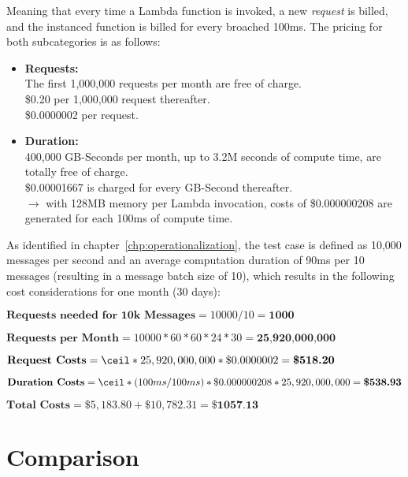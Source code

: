 Meaning that every time a Lambda function is invoked, a new \textit{request} is billed, and the instanced function is billed for every broached 100ms. The pricing for both subcategories is as follows: 

\begin{itemize}[label={}]
    \item \textbf{Requests:}\\
        The first 1,000,000 requests per month are free of charge.\\
        \$0.20 per 1,000,000 request thereafter.\\
        \$0.0000002 per request.\\
    \item \textbf{Duration:}\\
        400,000 GB-Seconds per month, up to 3.2M seconds of compute time, are totally free of charge.\\
        \$0.00001667 is charged for every GB-Second thereafter.\\
        $\longrightarrow$ with 128MB memory per Lambda invocation, costs of \$0.000000208 are generated for each 100ms of compute time. 
\end{itemize}

As identified in chapter~\vref{chp:operationalization}, the test case is defined as 10,000 messages per second and an average computation duration of 90ms per 10 messages (resulting in a message batch size of 10), which results in the following cost considerations for one month (30 days): 

$\textbf{Requests needed for 10k Messages} = 10000 / 10 = \textbf{1000}$

$\textbf{Requests per Month} = 10000 * 60 * 60 * 24 * 30 = \textbf{25,920,000,000}$

$\textbf{Request Costs} = \ceil*{25,920,000,000 * \$0.0000002} = \textbf{\$518.20}$

$\textbf{Duration Costs} = \ceil*{(100ms / 100ms) * \$0.000000208 * 25,920,000,000} = \textbf{\$538.93}$

$\textbf{Total Costs} = \$5,183.80 + \$10,782.31 = \textbf{\$1057.13}$

\section{Comparison}\label{chp:viaComp}

